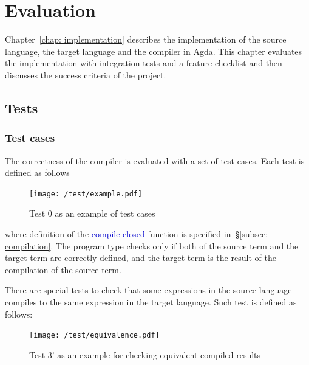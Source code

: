 \documentclass[12pt,a4paper]{report}
\theoremstyle{definition}
\newcommand{\secref}[1]{\S\ref{#1}}
\newcommand{\chapref}[1]{\ref{#1}}
\newcommand{\mb}[1]{\textcolor{mediumblue}{#1}}
\begin{document}
\chapter{Evaluation}
    \minitoc
    Chapter~\chapref{chap: implementation} describes the implementation of the source language, the target language and the compiler in Agda. This chapter evaluates the implementation with integration tests and a feature checklist and then discusses the success criteria of the project.
    \section{Tests}
    \subsection{Test cases}
    The correctness of the compiler is evaluated with a set of test cases. Each test is defined as follows
    \begin{figure}[H]
        \centering
        \texttt{[image: /test/example.pdf]}
        \caption{Test 0 as an example of test cases}
        \label{fig: test_case_0}
    \end{figure}
    where definition of the \mb{\textsf{compile-closed}} function is specified in~\secref{subsec: compilation}. The program type checks only if both of the source term and the target term are correctly defined, and the target term is the result of the compilation of the source term. 

    There are special tests to check that some expressions in the source language compiles to the same expression in the target language. Such test is defined as follows:
    \begin{figure}[H]
        \centering
        \texttt{[image: /test/equivalence.pdf]}
        \caption{Test 3' as an example for checking equivalent compiled results}
        \label{fig: test_case_3'}
    \end{figure}
\end{document}
